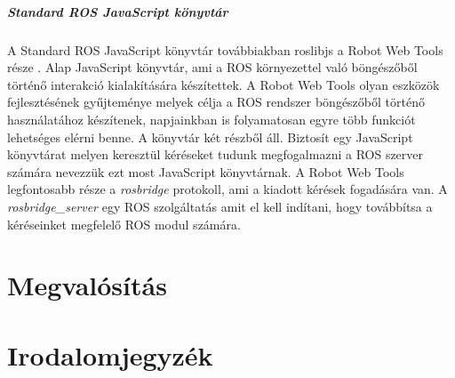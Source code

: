 \documentclass[12pt,a4paper,oneside]{report} %
\begin{document}
\paragraph{Standard ROS JavaScript könyvtár}
\label{roslibjs}
A Standard ROS JavaScript könyvtár továbbiakban roslibjs a Robot Web Tools része \cite{toris2015robot}.  Alap JavaScript könyvtár, ami a ROS környezettel való böngészőből történő interakció kialakítására készítettek. A Robot Web Tools olyan eszközök fejlesztésének gyűjteménye melyek célja a ROS rendszer böngészőből történő használatához készítenek, napjainkban is folyamatosan egyre több funkciót lehetséges elérni benne. A könyvtár két részből áll. Biztosít egy JavaScript könyvtárat melyen keresztül kéréseket tudunk megfogalmazni a ROS szerver számára nevezzük ezt most JavaScript könyvtárnak. A Robot Web Tools legfontosabb része a \textit{rosbridge} protokoll, ami a kiadott kérések fogadására van. A \textit{rosbridge\_server} egy ROS szolgáltatás amit el kell indítani, hogy továbbítsa a kéréseinket megfelelő ROS modul számára.


\chapter{Megvalósítás}
\chapter*{Irodalomjegyzék}
\printbibliography[heading=none]
\newpage
\listoffigures
{}
\end{document}
